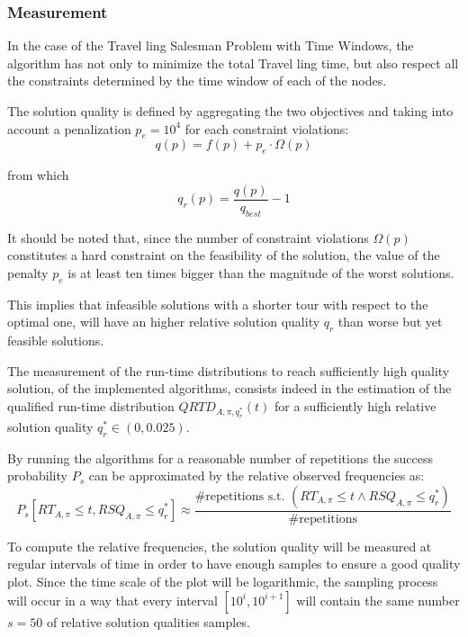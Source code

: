 \subsubsection{Measurement}\label{subsec:measure}
In the case of the Travel ling Salesman Problem with Time Windows, the algorithm has not only to minimize the total Travel ling time, but also respect all the constraints determined by the time window of each of the nodes.

The solution quality is defined by aggregating the two objectives and taking into account a penalization $p_e = 10^4$ for each constraint violations:
\begin{equation}
  q(p) = f(p) + p_e \cdot\Omega(p)
\end{equation}

from which
\begin{equation}
  q_r(p) = \frac{q(p)}{q_{best}} - 1
\end{equation}

It should be noted that, since the number of constraint violations $\Omega(p)$ constitutes a hard constraint on the feasibility of the solution, the value of the penalty $p_e$ is at least ten times bigger than the magnitude of the worst solutions.

This implies that infeasible solutions with a shorter tour with respect to the optimal one, will have an higher relative solution quality $q_r$ than worse but yet feasible solutions.

The measurement of the run-time distributions to reach sufficiently high quality solution, of the implemented algorithms, consists indeed in the estimation of the qualified run-time distribution $QRTD_{A,\pi,q_r^{*}}(t)$ for a sufficiently high relative solution quality $q_r^{*} \in (0,0.025)$.

By running the algorithms for a reasonable number of repetitions the success probability $P_s$ can be approximated by the relative observed frequencies as:
\begin{equation}
P_s[RT_{A,\pi} \le t,RSQ_{A,\pi} \le q_r^{*}] \approx \frac{\text{\#repetitions s.t. } (RT_{A,\pi} \le t \wedge RSQ_{A,\pi} \le q_r^{*})}{\text{\#repetitions}}   
\end{equation}

To compute the relative frequencies, the solution quality will be measured at regular intervals of time in order to have enough samples to ensure a good quality plot.
Since the time scale of the plot will be logarithmic, the sampling process will occur in a way that every interval $[10^i,10^{i+1}]$ will contain the same number $s=50$ of relative solution qualities samples.

